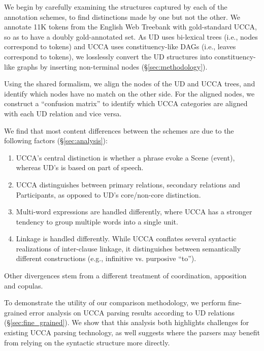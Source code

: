 \documentclass[11pt,a4paper]{article}
\begin{document}
  We begin by carefully examining the structures captured by each of the annotation schemes, to find distinctions made by one but not the other. 
  We annotate 11K tokens from the English Web Treebank with gold-standard UCCA, so as to have a doubly gold-annotated set.
  As UD uses bi-lexical trees (i.e., nodes correspond to tokens) and UCCA uses constituency-like DAGs (i.e., leaves correspond to tokens), 
  we losslessly convert the UD structures into constituency-like graphs by inserting non-terminal nodes (\S\ref{sec:methodology}). 
  
  Using the shared formalism, we align the nodes of the UD and UCCA trees, and identify which nodes have no match on the other side. 
  For the aligned nodes, we construct a ``confusion matrix'' to identify which UCCA categories are aligned with each UD relation and vice versa. 
  
   We find that most content differences between the schemes are due to the following
   factors (\S\ref{sec:analysis}):

  \begin{enumerate}[noitemsep]
      \item UCCA's central distinction is whether a phrase evoke a Scene (event),
        whereas UD's is based on part of speech. %
      \item UCCA distinguishes between primary relations, secondary relations
      and Participants, as opposed to UD's core/non-core distinction. %
      \item Multi-word expressions are handled differently,
        where UCCA has a stronger tendency to group multiple 
        words into a single unit. %
      \item Linkage is handled differently. While UCCA conflates several syntactic realizations of inter-clause linkage,
      it distinguishes between semantically different constructions
      (e.g., infinitive vs. purposive ``to''). %
   \end{enumerate}
    
   Other divergences stem from a different treatment of coordination, apposition and copulas.%
   
  To demonstrate the utility of our comparison methodology,
  we perform fine-grained error analysis on UCCA parsing results
  according to UD relations (\S\ref{sec:fine_grained}).
  We show that this analysis both highlights challenges for existing UCCA parsing technology,
  as well suggests where the parsers may benefit from relying on the syntactic structure more directly.
\end{document}
